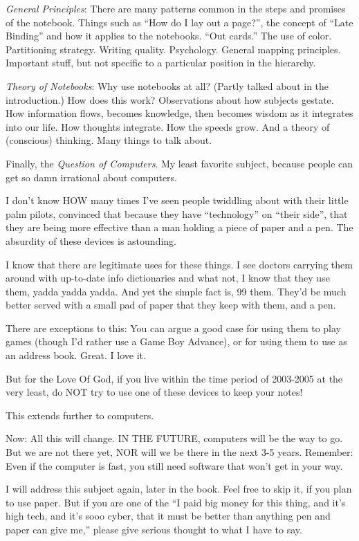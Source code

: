 \documentclass[oneside]{book}
\begin{document}
\emph{General Principles}:
There are many patterns common in the steps and promises of the
notebook. Things such as ``How do I lay out a page?'', the concept of
``Late Binding'' and how it applies to the notebooks. ``Out cards.'' The
use of color. Partitioning strategy. Writing
quality. Psychology. General mapping principles. Important stuff, but
not specific to a particular position in the hierarchy.

\emph{Theory of Notebooks}:
Why use notebooks at all? (Partly talked about in the introduction.)
How does this work? Observations about how subjects gestate. How
information flows, becomes knowledge, then becomes wisdom as it
integrates into our life. How thoughts integrate. How the speeds
grow. And a theory of (conscious) thinking. Many things to talk about.

Finally, the \emph{Question of Computers}. My least favorite subject, because
people can get so damn irrational about computers.

I don't know HOW many times I've seen people twiddling about with
their little palm pilots, convinced that because they have
``technology'' on ``their side'', that they are being more effective than
a man holding a piece of paper and a pen. The absurdity of these
devices is astounding.

I know that there are legitimate uses for these things. I see doctors
carrying them around with up-to-date info dictionaries and what not, I
know that they use them, yadda yadda yadda. And yet the simple fact
is, 99%
them. They'd be much better served with a small pad of paper that they
keep with them, and a pen.

There are exceptions to this: You can argue a good case for using them
to play games (though I'd rather use a Game Boy Advance), or for using
them to use as an address book. Great. I love it.

But for the Love Of God, if you live within the time period of
2003-2005 at the very least, do NOT try to use one of these devices to
keep your notes!

This extends further to computers.

Now: All this will change. IN THE FUTURE, computers will be the way to
go. But we are not there yet, NOR will we be there in the next 3-5
years. Remember: Even if the computer is fast, you still need software
that won't get in your way.

I will address this subject again, later in the book. Feel free to
skip it, if you plan to use paper. But if you are one of the ``I paid
big money for this thing, and it's high tech, and it's sooo cyber,
that it must be better than anything pen and paper can give me,''
please give serious thought to what I have to say.
\end{document}
